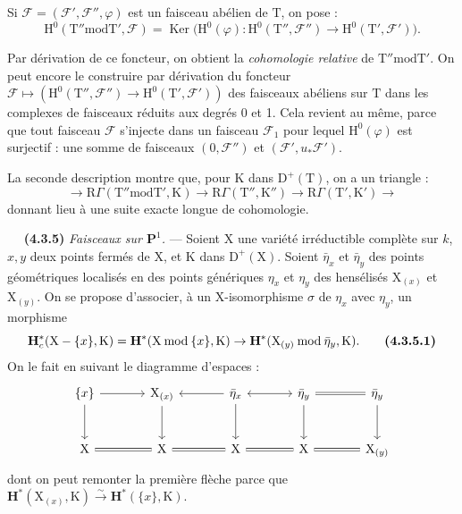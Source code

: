 \documentclass[11pt,leqno]{article}
\newcommand{\Page}[1]{\ifvmode\noindent\else\unskip\ \fi{\footnotesize\textcolor{gray}{[p.\,#1]}}\ \ignorespaces}
\begin{document}
Si \(\mathscr{F}=(\mathscr{F}',\mathscr{F}'',\varphi)\) est un faisceau abélien de \(\mathrm{T}\), on pose :
\[
\mathrm{H}^0(\mathrm{T}''\mathbin{\mathrm{mod}}\mathrm{T}',\mathscr{F})
=
\operatorname{Ker}
\bigl(\mathrm{H}^0(\varphi):
\mathrm{H}^0(\mathrm{T}'',\mathscr{F}'')
\to\mathrm{H}^0(\mathrm{T}',\mathscr{F}')\bigr).
\]

Par dérivation de ce foncteur, on obtient la \textit{cohomologie relative} de \(\mathrm{T}''\mathbin{\mathrm{mod}}\mathrm{T}'\). On peut encore le construire par dérivation du foncteur \(\mathscr{F}\mapsto(\mathrm{H}^0(\mathrm{T}'',\mathscr{F}'')\to\mathrm{H}^0(\mathrm{T}',\mathscr{F}'))\) des faisceaux abéliens sur \(\mathrm{T}\) dans les complexes de faisceaux réduits aux degrés 0 et 1. Cela revient au même, parce que tout faisceau \(\mathscr{F}\) s’injecte dans un faisceau \(\mathscr{F}_1\) pour lequel \(\mathrm{H}^0(\varphi)\) est surjectif : une somme de faisceaux \((0,\mathscr{F}'')\) et \((\mathscr{F}',u_*\mathscr{F}')\).

La seconde description montre que, pour \(\mathrm{K}\) dans \(\mathrm{D}^+(\mathrm{T})\), on a un triangle :
\[
\to\mathrm{R}\Gamma(\mathrm{T}''\mathbin{\mathrm{mod}}\mathrm{T}',\mathrm{K})
\to\mathrm{R}\Gamma(\mathrm{T}'',\mathrm{K}'')
\to\mathrm{R}\Gamma(\mathrm{T}',\mathrm{K}')
\to
\]
donnant lieu à une suite exacte longue de cohomologie.

\Page{224}
\textbf{(4.3.5)} \textit{Faisceaux sur \(\mathbf{P}^1\).} — Soient \(\mathrm{X}\) une variété irréductible complète sur \(k\), \(x,y\) deux points fermés de \(\mathrm{X}\), et \(\mathrm{K}\) dans \(\mathrm{D}^+(\mathrm{X})\). Soient \(\bar\eta_x\) et \(\bar\eta_y\) des points géométriques localisés en des points génériques \(\eta_x\) et \(\eta_y\) des hensélisés \(\mathrm{X}_{(x)}\) et \(\mathrm{X}_{(y)}\). On se propose d’associer, à un \(\mathrm{X}\)-isomorphisme \(\sigma\) de \(\eta_x\) avec \(\eta_y\), un morphisme
\[
\mathbf{H}_c^*(\mathrm{X}-\{x\},\mathrm{K})
=
\mathbf{H}^*(\mathrm{X}\mathbin{\mathrm{mod}}\{x\},\mathrm{K})
\to
\mathbf{H}^*(\mathrm{X}_{(y)}\mathbin{\mathrm{mod}}\bar\eta_y,\mathrm{K}).
\tag*{\textbf{(4.3.5.1)}}
\]
On le fait en suivant le diagramme d’espaces :
\[
\begin{tikzcd}[column sep=large,row sep=large]
\{x\} \arrow[r] \arrow[d]
  & \mathrm{X}_{(x)} \arrow[d]
  & \bar\eta_x \arrow[l] \arrow[r,leftrightarrow] \arrow[d]
  & \bar\eta_y \arrow[r,equal] \arrow[d]
  & \bar\eta_y \arrow[d] \\
\mathrm{X} \arrow[r,equal]
  & \mathrm{X} \arrow[r,equal]
  & \mathrm{X} \arrow[r,equal]
  & \mathrm{X} \arrow[r,equal]
  & \mathrm{X}_{(y)}
\end{tikzcd}
\]
dont on peut remonter la première flèche parce que \(\mathbf{H}^*(\mathrm{X}_{(x)},\mathrm{K})\xrightarrow{\sim}\mathbf{H}^*(\{x\},\mathrm{K})\).
\end{document}
